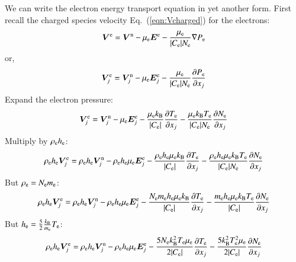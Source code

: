 \documentclass{warpdoc}
\renewcommand{\vec}[1]{\bm{#1}}
\begin{document}
We can write the electron energy transport equation in yet another form. First recall the charged species velocity Eq.\ (\ref{eqn:Vcharged}) for the electrons:
%
\begin{equation}
  \vec{V}^{\rm e}=\vec{V}^{\rm n} - \mu_{\rm e} \vec{E}^{\rm e} -\frac{\mu_{\rm e}}{|C_{\rm e}| N_{\rm e}}\nabla P_{\rm e}
\end{equation}
% 
or,
%
\begin{equation}
  \vec{V}^{\rm e}_j=\vec{V}^{\rm n}_j - \mu_{\rm e} \vec{E}^{\rm e}_j -\frac{\mu_{\rm e}}{|C_{\rm e}| N_{\rm e}} \frac{\partial P_{\rm e}}{\partial x_j} 
\end{equation}
% 
Expand the electron pressure:
%
\begin{equation}
  \vec{V}^{\rm e}_j=\vec{V}^{\rm n}_j - \mu_{\rm e} \vec{E}^{\rm e}_j 
    -\frac{\mu_{\rm e} k_{\rm B}}{|C_{\rm e}| } \frac{  \partial T_{\rm e}}{\partial x_j} 
    -\frac{\mu_{\rm e} k_{\rm B} T_{\rm e}}{|C_{\rm e}| N_{\rm e}} \frac{\partial N_{\rm e}  }{\partial x_j} 
\end{equation}
% 
Multiply by $\rho_{\rm e} h_{\rm e}$:
%
\begin{equation}
  \rho_{\rm e} h_{\rm e} \vec{V}^{\rm e}_j
  = \rho_{\rm e} h_{\rm e} \vec{V}^{\rm n}_j 
  - \rho_{\rm e} h_{\rm e} \mu_{\rm e} \vec{E}^{\rm e}_j 
  -\frac{\rho_{\rm e} h_{\rm e} \mu_{\rm e} k_{\rm B}}{|C_{\rm e}| } \frac{  \partial T_{\rm e}}{\partial x_j} 
  -\frac{\rho_{\rm e} h_{\rm e} \mu_{\rm e} k_{\rm B} T_{\rm e}}{|C_{\rm e}| N_{\rm e}} \frac{\partial N_{\rm e}  }{\partial x_j} 
\end{equation}
% 
But $\rho_{\rm e}=N_{\rm e} m_{\rm e}$:
%
\begin{equation}
  \rho_{\rm e} h_{\rm e} \vec{V}^{\rm e}_j
  = \rho_{\rm e} h_{\rm e} \vec{V}^{\rm n}_j 
  - \rho_{\rm e} h_{\rm e} \mu_{\rm e} \vec{E}^{\rm e}_j 
  -\frac{N_{\rm e} m_{\rm e} h_{\rm e} \mu_{\rm e} k_{\rm B}}{|C_{\rm e}| } \frac{  \partial T_{\rm e}}{\partial x_j} 
  -\frac{ m_{\rm e} h_{\rm e} \mu_{\rm e} k_{\rm B} T_{\rm e}}{|C_{\rm e}| } \frac{\partial N_{\rm e}  }{\partial x_j} 
\end{equation}
% 
But $h_{\rm e}=\frac{5}{2}\frac{k_{\rm B}}{m_{\rm e}} T_{\rm e}$:
%
\begin{equation}
  \rho_{\rm e} h_{\rm e} \vec{V}^{\rm e}_j
  = \rho_{\rm e} h_{\rm e} \vec{V}^{\rm n}_j 
  - \rho_{\rm e} h_{\rm e} \mu_{\rm e} \vec{E}^{\rm e}_j 
  -\frac{5 N_{\rm e} k_{\rm B}^2 T_{\rm e} \mu_{\rm e} }{2 |C_{\rm e}| } \frac{  \partial T_{\rm e}}{\partial x_j} 
  -\frac{5 k_{\rm B}^2 T_{\rm e}^2 \mu_{\rm e}}{2 |C_{\rm e}| } \frac{\partial N_{\rm e}  }{\partial x_j} 
\end{equation}
\end{document}
